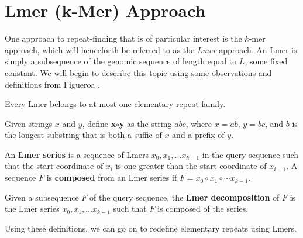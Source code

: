 \section{Lmer (k-Mer) Approach}
One approach to repeat-finding that is of particular interest is the $k$-mer approach, which will henceforth be referred to as the \textit{Lmer} approach. An Lmer is simply a subsequence of the genomic sequence of length equal to $L$, some fixed constant. We will begin to describe this topic using some observations and definitions from Figueroa \cite{figueroa2013raider}.

\begin{lem}
Every Lmer belongs to at most one elementary repeat family.
\end{lem}

\begin{defn}
Given strings $x$ and $y$, define \textbf{x$\circ$y} as the string $abc$, where $x=ab$, $y=bc$, and $b$ is the longest substring that is both a suffic of $x$ and a prefix of $y$.
\end{defn}

\begin{defn}
An \textbf{Lmer series} is a sequence of Lmers $x_{0}, x_{1}, \dotsc x_{k-1}$ in the query sequence such that the start coordinate of $x_{i}$ is one greater than the start coordinate of $x_{i-1}$. A sequence $F$ is \textbf{composed} from an Lmer series if $F=x_{0}\circ x_{1}\circ\dotsm x_{k-1}.$
\end{defn}

\begin{defn}
Given a subsequence $F$ of the query sequence, the \textbf{Lmer decomposition} of $F$ is the Lmer series $x_{0}, x_{1}, \dotsc x_{k-1}$ such that $F$ is composed of the series.
\end{defn}

Using these definitions, we can go on to redefine elementary repeats using Lmers.